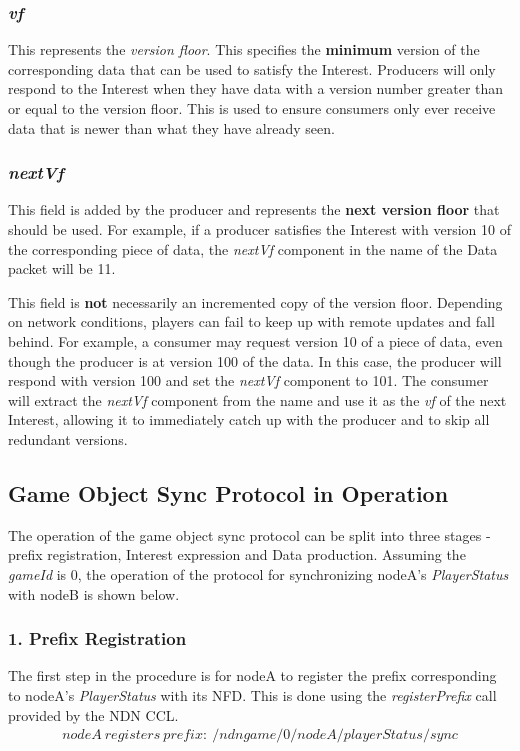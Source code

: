 \subsubsection{\textit{vf}}
This represents the \textit{version floor}. This specifies the \textbf{minimum} version of the corresponding data that can be used to satisfy the Interest. Producers will only respond to the Interest when they have data with a version number greater than or equal to the version floor. This is used to ensure consumers only ever receive data that is newer than what they have already seen.

\subsubsection{\textit{nextVf}}
This field is added by the producer and represents the \textbf{next version floor} that should be used. For example, if a producer satisfies the Interest with version 10 of the corresponding piece of data, the \textit{nextVf} component in the name of the Data packet will be 11.

This field is \textbf{not} necessarily an incremented copy of the version floor. Depending on network conditions, players can fail to keep up with remote updates and fall behind. For example, a consumer may request version 10 of a piece of data, even though the producer is at version 100 of the data. In this case, the producer will respond with version 100 and set the \textit{nextVf} component to 101. The consumer will extract the \textit{nextVf} component from the name and use it as the \textit{vf} of the next Interest, allowing it to immediately catch up with the producer and to skip all redundant versions.


\subsection{Game Object Sync Protocol in Operation}
The operation of the game object sync protocol can be split into three stages - prefix registration, Interest expression and Data production. Assuming the \textit{gameId} is 0, the operation of the protocol for synchronizing nodeA's \textit{PlayerStatus} with nodeB is shown below.

\subsubsection{1. Prefix Registration}
The first step in the procedure is for nodeA to register the prefix corresponding to nodeA's \textit{PlayerStatus} with its NFD. This is done using the \textit{registerPrefix} call provided by the NDN CCL.
\begin{align*}
    nodeA\ registers\ prefix:\ /ndngame/0/nodeA/playerStatus/sync
\end{align*}



